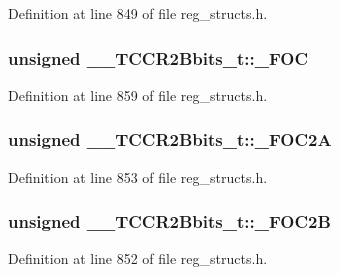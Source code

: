 Definition at line 849 of file reg\+\_\+structs.\+h.

\hypertarget{union_____t_c_c_r2_bbits__t_af5976c1288dee456474c9e21b9280f0f}{
\subsubsection[{\+\_\+\+F\+O\+C}]{\setlength{\rightskip}{0pt plus 5cm}unsigned \+\_\+\+\_\+\+T\+C\+C\+R2\+Bbits\+\_\+t\+::\+\_\+\+F\+O\+C}}\label{union_____t_c_c_r2_bbits__t_af5976c1288dee456474c9e21b9280f0f}


Definition at line 859 of file reg\+\_\+structs.\+h.

\hypertarget{union_____t_c_c_r2_bbits__t_af7109837ddbfc710790c414e5afd9b6c}{
\subsubsection[{\+\_\+\+F\+O\+C2\+A}]{\setlength{\rightskip}{0pt plus 5cm}unsigned \+\_\+\+\_\+\+T\+C\+C\+R2\+Bbits\+\_\+t\+::\+\_\+\+F\+O\+C2\+A}}\label{union_____t_c_c_r2_bbits__t_af7109837ddbfc710790c414e5afd9b6c}


Definition at line 853 of file reg\+\_\+structs.\+h.

\hypertarget{union_____t_c_c_r2_bbits__t_a1a06ce35b94e3328e8f67b74a4047b37}{
\subsubsection[{\+\_\+\+F\+O\+C2\+B}]{\setlength{\rightskip}{0pt plus 5cm}unsigned \+\_\+\+\_\+\+T\+C\+C\+R2\+Bbits\+\_\+t\+::\+\_\+\+F\+O\+C2\+B}}\label{union_____t_c_c_r2_bbits__t_a1a06ce35b94e3328e8f67b74a4047b37}


Definition at line 852 of file reg\+\_\+structs.\+h.

